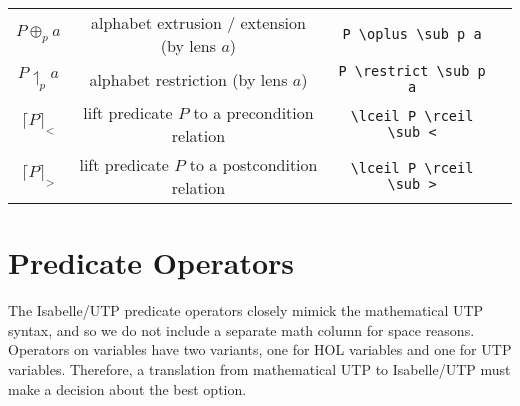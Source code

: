 \documentclass[11pt]{article}
\begin{document}
\begin{center}
\begin{tabular}{|c|c|c|c|}
  $P \oplus_p a$                & alphabet extrusion / extension (by lens $a$)     & \verb|P \oplus \sub p a| \\
  $P \upharpoonleft_p a$        & alphabet restriction (by lens $a$)               & \verb|P \restrict \sub p a| \\
  $\lceil P \rceil_<$           & lift predicate $P$ to a precondition relation    & \verb|\lceil P \rceil \sub <| \\
  $\lceil P \rceil_>$           & lift predicate $P$ to a postcondition relation   & \verb|\lceil P \rceil \sub >| \\
  \hline
\end{tabular}  
\end{center}

\newpage

\section{Predicate Operators}

The Isabelle/UTP predicate operators closely mimick the mathematical UTP syntax, and so we do not include a separate
math column for space reasons. Operators on variables have two variants, one for HOL variables and one for UTP
variables. Therefore, a translation from mathematical UTP to Isabelle/UTP must make a decision about the best option.
\end{document}
